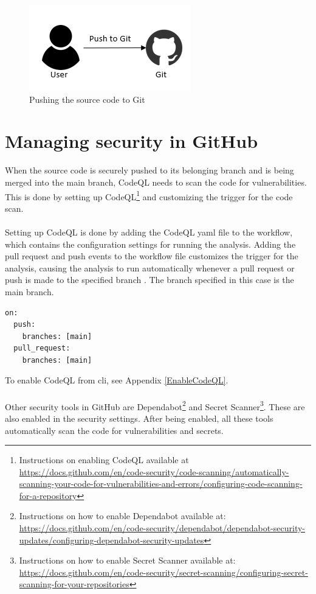 \vspace{2mm}
\begin{figure}[H]
    \centering
    \includegraphics[width=0.5\columnwidth]{Images/aws-piplin-1.png}
    \caption{Pushing the source code to Git}
    \label{fig: Pushing the source code to Git}
\end{figure}

\section{Managing security in GitHub}
When the source code is securely pushed to its belonging branch and is being merged into the main branch, CodeQL needs to scan the code for vulnerabilities. This is done by setting up CodeQL\footnote{Instructions on enabling CodeQL available at \url{https://docs.github.com/en/code-security/code-scanning/automatically-scanning-your-code-for-vulnerabilities-and-errors/configuring-code-scanning-for-a-repository}} and customizing the trigger for the code scan. 
\\~\\
Setting up CodeQL is done by adding the CodeQL \acrshort{yaml} file to the workflow, which contains the configuration settings for running the analysis. Adding the pull request and push events to the workflow file customizes the trigger for the analysis, causing the analysis to run automatically whenever a pull request or push is made to the specified branch \cite{CodeQLCustom}. The branch specified in this case is the main branch. 

\vspace{2mm}
\begin{lstlisting}[language=terraform, caption=Custom trigger for CodeQL alerts, captionpos=b, frame=single]
on:
  push:
    branches: [main]
  pull_request:
    branches: [main]
\end{lstlisting}

To enable CodeQL from \acrshort{cli}, see Appendix \ref{EnableCodeQL}.
\\~\\
Other security tools in GitHub are Dependabot\footnote{Instructions on how to enable Dependabot available at: \url{https://docs.github.com/en/code-security/dependabot/dependabot-security-updates/configuring-dependabot-security-updates}} and Secret Scanner\footnote{Instructions on how to enable Secret Scanner available at: \url{https://docs.github.com/en/code-security/secret-scanning/configuring-secret-scanning-for-your-repositories}}. These are also enabled in the security settings. After being enabled, all these tools automatically scan the code for vulnerabilities and secrets.

